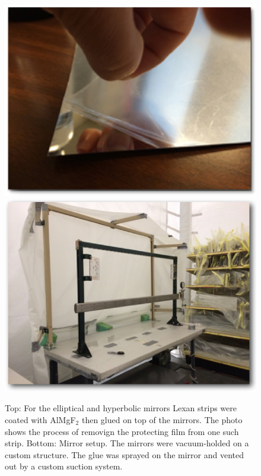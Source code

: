 \begin{figure}[t]
\centering
	\includegraphics[width=0.98\columnwidth,keepaspectratio]{img/filmOnStrip.png}
	\includegraphics[width=0.98\columnwidth,keepaspectratio]{img/mirrorSetup.png}
	\caption{Top: For the elliptical and hyperbolic mirrors Lexan strips were coated with AlMgF$_2$
             then glued on top of the mirrors. The photo shows the process of removign the
             protecting film from one such strip. Bottom: Mirror setup. The mirrors were
             vacuum-holded on a custom structure. The glue was sprayed on the mirror and
             vented out by a custom suction system.}
	\label{fig:filmOnStrip}
\end{figure}


